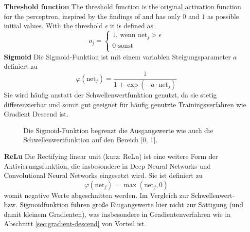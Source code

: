 		
		\textbf{Threshold function}
		The threshold function is the original activation function for the perceptron, inspired by the findings of \cite{McCulloch1943} and has only $0$ and $1$ as possible initial values. With the threshold $\epsilon$ it is defined as
		\begin{equation}
		\label{eq:acti-sw}
		o_j = \left\{
		\begin{array}{ll}
		1\text{, wenn } \text{net}_j > \epsilon \\
		0 \text{ sonst}\\
		\end{array}
		\right.
		\end{equation}
		\textbf{Sigmoid}
			Die Sigmoid-Funktion ist mit einem variablen Steigungsparameter $a$ definiert zu 
			\begin{equation}
			\varphi\left(\text{net}_j\right) = \frac{1}{1+\exp(-a \cdot \text{net}_j)}
			\end{equation}
			Sie wird häufig anstatt der Schwellenwertfunktion genutzt, da sie stetig differenzierbar und somit gut geeignet für häufig genutzte Trainingsverfahren wie Gradient Descend ist.\\
			\begin{figure}[ht]
				\centering
				\caption{Die Sigmoid-Funktion begrenzt die Ausgangswerte wie auch die Schwellenwertfunktion auf den Bereich [0, 1].}
				\label{fig:sigmoid_plot}
			\end{figure}


		\textbf{ReLu}
		Die Rectifying linear unit (kurz: ReLu) ist eine weitere Form der Aktivierungsfunktion, die insbesondere in Deep Neural Networks und Convolutional Neural Networks eingesetzt wird. Sie ist definiert zu
		\begin{equation}
			\label{eq:relu_def}
			\varphi(\text{net}_j) = \max(\text{net}_j, 0)
		\end{equation}
		womit negative Werte abgeschnitten werden. Im Vergleich zur Schwellenwert- bzw. Sigmoidfunktion führen große Eingangswerte hier nicht zur Sättigung (und damit kleinem Gradienten), was insbesondere in Gradientenverfahren wie in Abschnitt \ref{sec:gradient-descend} von Vorteil ist. \\
		
